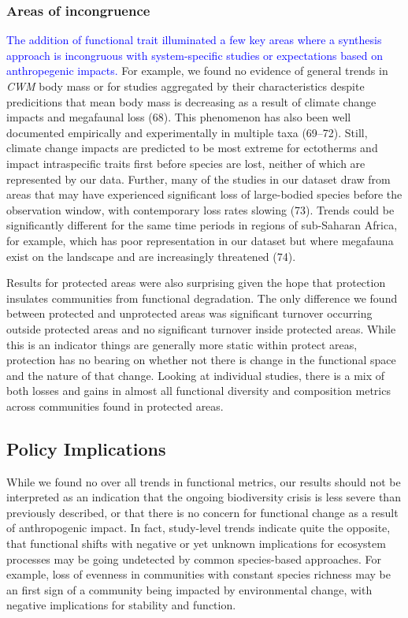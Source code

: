 \documentclass{article}
\begin{document}
\hypertarget{areas-of-incongruence}{%
\subsubsection{Areas of incongruence}\label{areas-of-incongruence}}

\textcolor{blue}{The addition of functional trait illuminated a few key areas where a synthesis approach is incongruous with system-specific studies or expectations based on anthropegenic impacts.}
For example, we found no evidence of general trends in \emph{CWM} body
mass or for studies aggregated by their characteristics despite
predicitions that mean body mass is decreasing as a result of climate
change impacts and megafaunal loss (68). This phenomenon has also been
well documented empirically and experimentally in multiple taxa
(69--72). Still, climate change impacts are predicted to be most extreme
for ectotherms and impact intraspecific traits first before species are
lost, neither of which are represented by our data. Further, many of the
studies in our dataset draw from areas that may have experienced
significant loss of large-bodied species before the observation window,
with contemporary loss rates slowing (73). Trends could be significantly
different for the same time periods in regions of sub-Saharan Africa,
for example, which has poor representation in our dataset but where
megafauna exist on the landscape and are increasingly threatened (74).

Results for protected areas were also surprising given the hope that
protection insulates communities from functional degradation. The only
difference we found between protected and unprotected areas was
significant turnover occurring outside protected areas and no
significant turnover inside protected areas. While this is an indicator
things are generally more static within protect areas, protection has no
bearing on whether not there is change in the functional space and the
nature of that change. Looking at individual studies, there is a mix of
both losses and gains in almost all functional diversity and composition
metrics across communities found in protected areas.

\hypertarget{policy-implications}{%
\subsection{Policy Implications}\label{policy-implications}}

While we found no over all trends in functional metrics, our results
should not be interpreted as an indication that the ongoing biodiversity
crisis is less severe than previously described, or that there is no
concern for functional change as a result of anthropogenic impact. In
fact, study-level trends indicate quite the opposite, that functional
shifts with negative or yet unknown implications for ecosystem processes
may be going undetected by common species-based approaches. For example,
loss of evenness in communities with constant species richness may be an
first sign of a community being impacted by environmental change, with
negative implications for stability and function.
\end{document}
